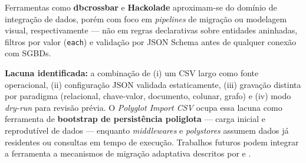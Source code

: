 Ferramentas como \textbf{dbcrossbar} \cite{dbcrossbar2024} e \textbf{Hackolade}
\cite{hackolade2024polyglot} aproximam-se do domínio de integração de dados, porém com
foco em \textit{pipelines} de migração ou modelagem visual, respectivamente --- não em
regras declarativas sobre entidades aninhadas, filtros por valor (\texttt{each}) e
validação por JSON Schema antes de qualquer conexão com SGBDs.

\textbf{Lacuna identificada:} a combinação de (i) um CSV largo como fonte operacional,
(ii) configuração JSON validada estaticamente, (iii) gravação distinta por paradigma
(relacional, chave-valor, documento, colunar, grafo) e (iv) modo \textit{dry-run} para
revisão prévia. O \textit{Polyglot Import CSV} ocupa essa lacuna como ferramenta de
\textbf{bootstrap de persistência poliglota} --- carga inicial e reprodutível de dados ---
enquanto \textit{middlewares} e \textit{polystores} assumem dados já residentes ou
consultas em tempo de execução. Trabalhos futuros podem integrar a ferramenta a mecanismos
de migração adaptativa descritos por  e
.
